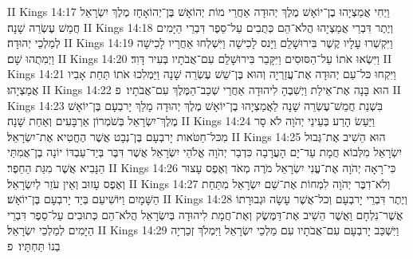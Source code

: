 II Kings 14:17	וַיְחִי אֲמַצְיָהוּ בֶן־יוֹאָשׁ מֶלֶךְ יְהוּדָה אַחֲרֵי מוֹת יְהוֹאָשׁ בֶּן־יְהוֹאָחָז מֶלֶךְ יִשְׂרָאֵל חֲמֵשׁ עֶשְׂרֵה שָׁנָה׃
II Kings 14:18	וְיֶתֶר דִּבְרֵי אֲמַצְיָהוּ הֲלֹא־הֵם כְּתֻבִים עַל־סֵפֶר דִּבְרֵי הַיָּמִים לְמַלְכֵי יְהוּדָה׃
II Kings 14:19	וַיִּקְשְׁרוּ עָלָיו קֶשֶׁר בִּירוּשָׁלַ͏ִם וַיָּנס לָכִישָׁה וַיִּשְׁלְחוּ אַחֲרָיו לָכִישָׁה וַיְמִתֻהוּ שָׁם׃
II Kings 14:20	וַיִּשְׂאוּ אֹתוֹ עַל־הַסּוּסִים וַיִּקָּבֵר בִּירוּשָׁלַ͏ִם עִם־אֲבֹתָיו בְּעִיר דָּוִד׃
II Kings 14:21	וַיִּקְחוּ כּל־עַם יְהוּדָה אֶת־עֲזַרְיָה וְהוּא בֶּן־שֵׁשׁ עֶשְׂרֵה שָׁנָה וַיַּמְלִכוּ אֹתוֹ תַּחַת אָבִיו אֲמַצְיָהוּ׃
II Kings 14:22	הוּא בָּנָה אֶת־אֵילַת וַיְשִׁבֶהָ לִיהוּדָה אַחֲרֵי שְׁכַב־הַמֶּלֶךְ עִם־אֲבֹתָיו׃ {פ}
II Kings 14:23	בִּשְׁנַת חֲמֵשׁ־עֶשְׂרֵה שָׁנָה לַאֲמַצְיָהוּ בֶן־יוֹאָשׁ מֶלֶךְ יְהוּדָה מָלַךְ יָרבְעָם בֶּן־יוֹאָשׁ מֶלֶךְ־יִשְׂרָאֵל בְּשֹׁמְרוֹן אַרְבָּעִים וְאַחַת שָׁנָה׃
II Kings 14:24	וַיַּעַשׂ הָרַע בְּעֵינֵי יְהֹוָה לֹא סָר מִכּל־חַטֹּאות יָרבְעָם בֶּן־נְבָט אֲשֶׁר הֶחֱטִיא אֶת־יִשְׂרָאֵל׃
II Kings 14:25	הוּא הֵשִׁיב אֶת־גְּבוּל יִשְׂרָאֵל מִלְּבוֹא חֲמָת עַד־יָם הָעֲרָבָה כִּדְבַר יְהֹוָה אֱלֹהֵי יִשְׂרָאֵל אֲשֶׁר דִּבֶּר בְּיַד־עַבְדּוֹ יוֹנָה בֶן־אֲמִתַּי הַנָּבִיא אֲשֶׁר מִגַּת הַחֵפֶר׃
II Kings 14:26	כִּי־רָאָה יְהֹוָה אֶת־עֳנִי יִשְׂרָאֵל מֹרֶה מְאֹד וְאֶפֶס עָצוּר וְאֶפֶס עָזוּב וְאֵין עֹזֵר לְיִשְׂרָאֵל׃
II Kings 14:27	וְלֹא־דִבֶּר יְהֹוָה לִמְחוֹת אֶת־שֵׁם יִשְׂרָאֵל מִתַּחַת הַשָּׁמָיִם וַיּוֹשִׁיעֵם בְּיַד יָרבְעָם בֶּן־יוֹאָשׁ׃
II Kings 14:28	וְיֶתֶר דִּבְרֵי יָרבְעָם וְכל־אֲשֶׁר עָשָׂה וּגְבוּרָתוֹ אֲשֶׁר־נִלְחָם וַאֲשֶׁר הֵשִׁיב אֶת־דַּמֶּשֶׂק וְאֶת־חֲמָת לִיהוּדָה בְּיִשְׂרָאֵל הֲלֹא־הֵם כְּתוּבִים עַל־סֵפֶר דִּבְרֵי הַיָּמִים לְמַלְכֵי יִשְׂרָאֵל׃
II Kings 14:29	וַיִּשְׁכַּב יָרבְעָם עִם־אֲבֹתָיו עִם מַלְכֵי יִשְׂרָאֵל וַיִּמְלֹךְ זְכַרְיָה בְנוֹ תַּחְתָּיו׃ {פ}
